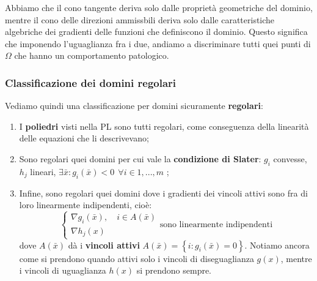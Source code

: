 \documentclass[a4paper,11pt]{article}
\begin{document}
\begin{itemize}
Abbiamo che il cono tangente deriva solo dalle proprietà geometriche del dominio, mentre il cono delle direzioni ammissbili deriva solo dalle caratteristiche algebriche dei gradienti delle funzioni che definiscono il dominio.
Questo significa che imponendo l'uguaglianza fra i due, andiamo a discriminare tutti quei punti di $\Omega$ che hanno un comportamento patologico. 

\subsubsection{Classificazione dei domini regolari}
Vediamo quindi una classificazione per domini sicuramente \textbf{regolari}:
\begin{enumerate}
	\item I \textbf{poliedri} visti nella PL sono tutti regolari, come conseguenza della linearità delle equazioni che li descrivevano;
	\item Sono regolari quei domini per cui vale la \textbf{condizione di Slater}: $g_i$ convesse, $h_j$ lineari, $\exists \bar{x} : g_i(\bar{x}) < 0 \ \ \forall i \in 1, ..., m$ ;
	\item Infine, sono regolari quei domini dove i gradienti dei vincoli attivi sono fra di loro linearmente indipendenti, cioè: $$
		\begin{cases}
			\nabla g_i(\bar{x}), \quad i \in A(\bar{x})	\\ 
			\nabla h_j(x)
		\end{cases}
		\text{sono linearmente indipendenti}
	$$
	dove $A(\bar{x})$ dà i \textbf{vincoli attivi} $A(\bar{x}) = \left\{ i : g_i(\bar{x}) = 0 \right\}$.
Notiamo ancora come si prendono quando attivi solo i vincoli di diseguaglianza $g(x)$, mentre i vincoli di uguaglianza $h(x)$ si prendono sempre.
\end{enumerate}

\end{itemize}
\end{document}
